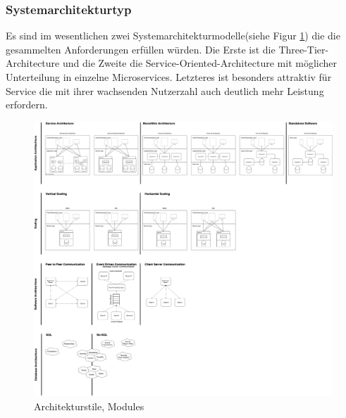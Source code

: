 \documentclass[10pt]{article}
\begin{document}
            \subsubsection{Systemarchitekturtyp}\label{sec:systemarchitecuretype}
            Es sind im wesentlichen zwei Systemarchitekturmodelle(siehe Figur \ref{fig:architecturstyles}) die die gesammelten Anforderungen erfüllen würden. Die Erste ist die Three-Tier-Architecture und die Zweite die Service-Oriented-Architecture mit möglicher Unterteilung in einzelne Microservices. Letzteres ist besonders attraktiv für Service die mit ihrer wachsenden Nutzerzahl auch deutlich mehr Leistung erfordern.
            \begin{figure}[hb] %
                \includegraphics[width=1\textwidth]{../../Systemarchitektur/PPSS21_Mai_Architekturstile_gegenuebergestellt.png}
                \caption[Architekturstile]{Architekturstile, Modules}
                \label{fig:architecturstyles}
            \end{figure}
\end{document}

